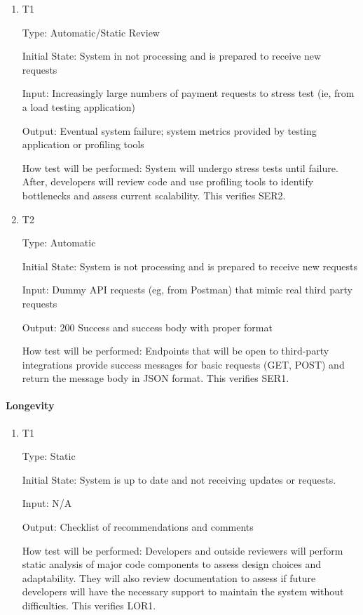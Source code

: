 \documentclass[12pt, titlepage]{article}
\begin{document}
\begin{enumerate}
\item{T1\\}
\hypertarget{NFR12.6-TC1}{}

Type: Automatic/Static Review

Initial State: System in not processing and is prepared to receive new requests

Input: Increasingly large numbers of payment requests to stress test (ie, from a load testing application)

Output: Eventual system failure; system metrics provided by testing application or profiling tools

How test will be performed: System will undergo stress tests until failure. After, developers will review code and use profiling tools to identify bottlenecks and assess current scalability. This verifies SER2.

\item{T2\\}
\hypertarget{NFR12.6-TC2}{}

Type: Automatic

Initial State: System is not processing and is prepared to receive new requests

Input: Dummy API requests (eg, from Postman) that mimic real third party requests

Output: 200 Success and success body with proper format

How test will be performed: Endpoints that will be open to third-party integrations provide success messages for basic requests (GET, POST) and return the message body in JSON format. This verifies SER1.

\end{enumerate}

\paragraph{Longevity}

\begin{enumerate}

\item{T1\\}
\hypertarget{NFR12.7-TC1}{}

Type: Static

Initial State: System is up to date and not receiving updates or requests.

Input: N/A

Output: Checklist of recommendations and comments

How test will be performed: Developers and outside reviewers will perform static analysis of major code components to assess design choices and adaptability. They will also review documentation to assess if future developers will have the necessary support to maintain the system without difficulties. This verifies LOR1.

\end{enumerate}
\end{document}
